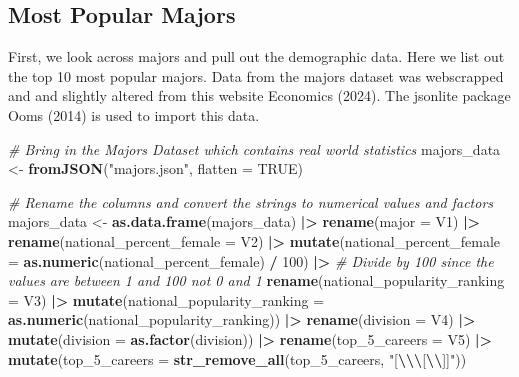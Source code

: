 \documentclass[
  twocolumn]{article}
\newenvironment{Shaded}{\begin{snugshade}}{\end{snugshade}}
\newcommand{\AttributeTok}[1]{\textcolor[rgb]{0.13,0.29,0.53}{#1}}
\newcommand{\CommentTok}[1]{\textcolor[rgb]{0.56,0.35,0.01}{\textit{#1}}}
\newcommand{\ConstantTok}[1]{\textcolor[rgb]{0.56,0.35,0.01}{#1}}
\newcommand{\DecValTok}[1]{\textcolor[rgb]{0.00,0.00,0.81}{#1}}
\newcommand{\FunctionTok}[1]{\textcolor[rgb]{0.13,0.29,0.53}{\textbf{#1}}}
\newcommand{\NormalTok}[1]{#1}
\newcommand{\OtherTok}[1]{\textcolor[rgb]{0.56,0.35,0.01}{#1}}
\newcommand{\SpecialCharTok}[1]{\textcolor[rgb]{0.81,0.36,0.00}{\textbf{#1}}}
\newcommand{\StringTok}[1]{\textcolor[rgb]{0.31,0.60,0.02}{#1}}
\begin{document}
\subsection{Most Popular Majors}\label{most-popular-majors}

First, we look across majors and pull out the demographic data. Here we
list out the top 10 most popular majors. Data from the majors dataset
was webscrapped and and slightly altered from this website Economics
(2024). The jsonlite package Ooms (2014) is used to import this data.

\begin{Shaded}
\begin{Highlighting}[]
\CommentTok{\# Bring in the Majors Dataset which contains real world statistics}
\NormalTok{majors\_data }\OtherTok{\textless{}{-}} \FunctionTok{fromJSON}\NormalTok{(}\StringTok{"majors.json"}\NormalTok{, }\AttributeTok{flatten =} \ConstantTok{TRUE}\NormalTok{)}

\CommentTok{\# Rename the columns and convert the strings to numerical values and factors}
\NormalTok{majors\_data }\OtherTok{\textless{}{-}} \FunctionTok{as.data.frame}\NormalTok{(majors\_data) }\SpecialCharTok{|\textgreater{}}
  \FunctionTok{rename}\NormalTok{(}\AttributeTok{major =}\NormalTok{ V1) }\SpecialCharTok{|\textgreater{}}
  \FunctionTok{rename}\NormalTok{(}\AttributeTok{national\_percent\_female =}\NormalTok{ V2) }\SpecialCharTok{|\textgreater{}}
  \FunctionTok{mutate}\NormalTok{(}\AttributeTok{national\_percent\_female =} \FunctionTok{as.numeric}\NormalTok{(national\_percent\_female) }\SpecialCharTok{/} \DecValTok{100}\NormalTok{) }\SpecialCharTok{|\textgreater{}}
  \CommentTok{\# Divide by 100 since the values are between 1 and 100 not 0 and 1}
  \FunctionTok{rename}\NormalTok{(}\AttributeTok{national\_popularity\_ranking =}\NormalTok{ V3) }\SpecialCharTok{|\textgreater{}}
  \FunctionTok{mutate}\NormalTok{(}\AttributeTok{national\_popularity\_ranking =} \FunctionTok{as.numeric}\NormalTok{(national\_popularity\_ranking)) }\SpecialCharTok{|\textgreater{}}
  \FunctionTok{rename}\NormalTok{(}\AttributeTok{division =}\NormalTok{ V4) }\SpecialCharTok{|\textgreater{}}
  \FunctionTok{mutate}\NormalTok{(}\AttributeTok{division =} \FunctionTok{as.factor}\NormalTok{(division)) }\SpecialCharTok{|\textgreater{}}
  \FunctionTok{rename}\NormalTok{(}\AttributeTok{top\_5\_careers =}\NormalTok{ V5) }\SpecialCharTok{|\textgreater{}}
  \FunctionTok{mutate}\NormalTok{(}\AttributeTok{top\_5\_careers =} \FunctionTok{str\_remove\_all}\NormalTok{(top\_5\_careers, }\StringTok{"[}\SpecialCharTok{\textbackslash{}\textquotesingle{}\textbackslash{}\textbackslash{}}\StringTok{[}\SpecialCharTok{\textbackslash{}\textbackslash{}}\StringTok{]]"}\NormalTok{))}


\end{Highlighting}
\end{Shaded}
\end{document}
